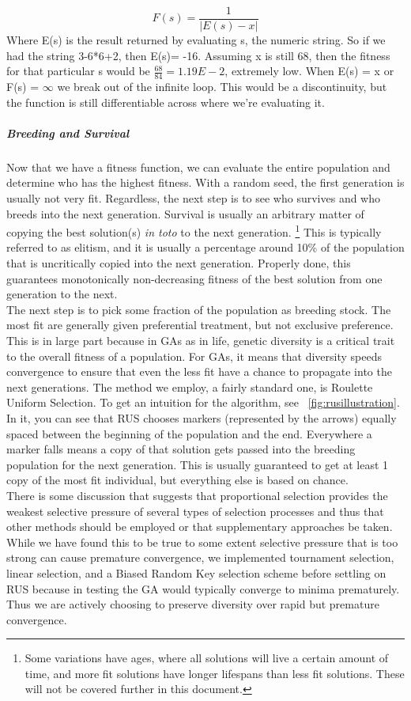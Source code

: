 \begin{equation*}
F(s) = \frac{1}{|E(s)-x|}
\end{equation*}
Where E(s) is the result returned by evaluating s, the numeric string.  So if we had the string 3-6*6+2, then E(s)= -16.  Assuming x is still 68, then the fitness for that particular s would be \(\frac{68}{84}= 1.19E-2\), extremely low. When 
E(s) = x or F(s) = ${\infty}$
we break out of the infinite loop.  This would be a discontinuity, but the function is still differentiable across where we're evaluating it.
\subparagraph{Breeding and Survival}
Now that we have a fitness function, we can evaluate the entire population and determine who has the highest fitness.  With a random seed, the first generation is usually not very fit.  Regardless, the next step is to see who survives and who breeds into the next generation.
Survival is usually an arbitrary matter of copying the best solution(s) \textit{in toto} to the next generation.  \footnote{Some variations have ages, where all solutions will live a certain amount of time, and more fit solutions have longer lifespans than less fit solutions.  These will not be covered further in this document.}  This is typically referred to as elitism, and it is usually a percentage around 10\% of the population that is uncritically copied into the next generation.  Properly done, this guarantees monotonically non-decreasing fitness of the best solution from one generation to the next.\\
The next step is to pick some fraction of the population as breeding stock.  The most fit are generally given preferential treatment, but not exclusive preference.  This is in large part because in GAs as in life, genetic diversity is a critical trait to the overall fitness of a population.  For GAs, it means that diversity speeds convergence to ensure that even the less fit have a chance to propagate into the next generations.  The method we employ, a fairly standard one, is Roulette Uniform Selection.  To get an intuition for the algorithm, see ~\ref{fig:rusillustration}.  In it, you can see that RUS chooses markers (represented by the arrows) equally spaced between the beginning of the population and the end.  Everywhere a marker falls means a copy of that solution gets passed into the breeding population for the next generation.  This is usually guaranteed to get at least 1 copy of the most fit individual, but everything else is based on chance.  \\
There is some discussion that suggests that proportional selection provides the weakest selective pressure of several types of selection processes and thus that other methods should be employed or that supplementary approaches be taken\citep{back_selective_1994}. While we have found this to be true to some extent selective pressure that is too strong can cause premature convergence\citep{affenzeller_self-adaptive_2003}, we implemented tournament selection, linear selection, and a Biased Random Key selection scheme \citep{ruiz_biased_2015} before settling on RUS because in testing the GA would typically converge to minima prematurely.  Thus we are actively choosing to preserve diversity over rapid but premature convergence.
